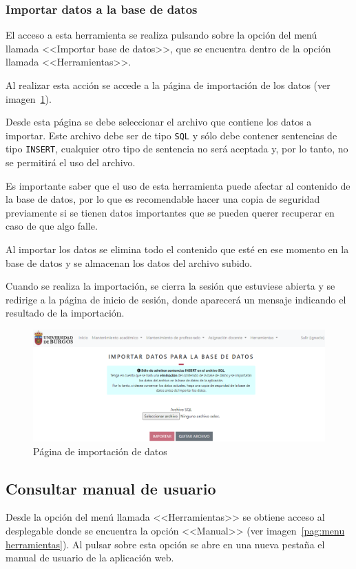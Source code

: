 \subsubsection{Importar datos a la base de datos}
El acceso a esta herramienta se realiza pulsando sobre la opción del menú llamada <<Importar base de datos>>, que se encuentra dentro de la opción llamada <<Herramientas>>.

Al realizar esta acción se accede a la página de importación de los datos (ver imagen~\ref{pag:importar}).

Desde esta página se debe seleccionar el archivo que contiene los datos a importar.
Este archivo debe ser de tipo \texttt{SQL} y sólo debe contener sentencias de tipo \texttt{INSERT}, cualquier otro tipo de sentencia no será aceptada y, por lo tanto, no se permitirá el uso del archivo.

Es importante saber que el uso de esta herramienta puede afectar al contenido de la base de datos, por lo que es recomendable hacer una copia de seguridad previamente si se tienen datos importantes que se pueden querer recuperar en caso de que algo falle.

Al importar los datos se elimina todo el contenido que esté en ese momento en la base de datos y se almacenan los datos del archivo subido.

Cuando se realiza la importación, se cierra la sesión que estuviese abierta y se redirige a la página de inicio de sesión, donde aparecerá un mensaje indicando el resultado de la importación.

\begin{figure}
	\centering
	\includegraphics[width=\textwidth]{../img/Anexos/Manual usuario/importar.png}
	\caption{Página de importación de datos}\label{pag:importar}
\end{figure}

\subsection{Consultar manual de usuario}
Desde la opción del menú llamada <<Herramientas>> se obtiene acceso al desplegable donde se encuentra la opción <<Manual>> (ver imagen~\ref{pag:menu herramientas}).
Al pulsar sobre esta opción se abre en una nueva pestaña el manual de usuario de la aplicación web.

